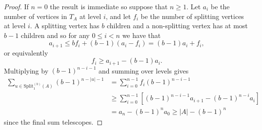\documentclass[11pt]{amsart}
\newcommand\labs[1]{\left\lvert#1\right\rvert}
\newcommand{\Split}{\mathrm{Split}}
\renewcommand{\leq}{\leqslant}
\renewcommand{\geq}{\geqslant}
\theoremstyle{plain}
\theoremstyle{definition}
\theoremstyle{remark}
\begin{document}
\begin{proof}
If $n=0$ the result is immediate so suppose that $n\geq 1$. Let $a_i$ be the number of vertices in $T_A$ at level $i$, and let $f_i$ be the number of splitting vertices at level $i$. A splitting vertex has $b$ children and a non-splitting vertex has at most $b-1$ children and so for any $0\leq i <n$ we have that
\[ a_{i+1} \leq b f_i + (b-1)(a_i-f_i) = (b-1)a_i + f_i,\]
or equivalently
\[ f_i \geq a_{i+1} - (b-1) a_i.\] 
Multiplying by $(b-1)^{n-i-1}$ and summing over levels gives
\begin{align*}
\sum_{u\in \Split_1^{(b)}(A)} (b-1)^{n-\labs{u}-1} & = \sum_{i=0}^{n-1}f_i (b-1)^{n-i-1}\\
& \geq \sum_{i=0}^{n-1} \left[ (b-1)^{n-i-1}a_{i+1} - (b-1)^{n-i}a_i \right]\\
&= a_n - (b-1)^n a_0 \geq \labs{A} - (b-1)^n
\end{align*}
since the final sum telescopes.
\end{proof}
\end{document}
